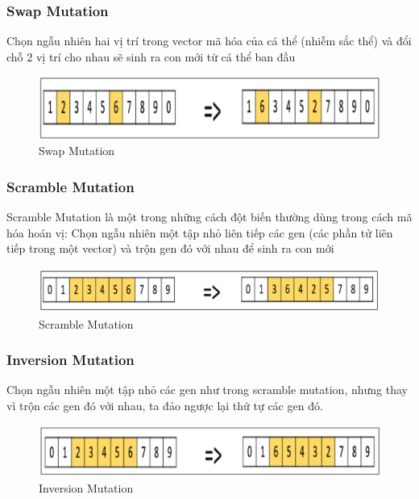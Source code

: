 \documentclass[a4paper,12pt]{report}
\begin{document}
\subsubsection{Swap Mutation}
Chọn ngẫu nhiên hai vị trí trong vector mã hóa của cá thể (nhiễm sắc thể) và đổi chỗ 2 vị trí cho nhau sẽ sinh ra con mới từ cá thể ban đầu
\begin{figure}[H]
\centering 
\includegraphics[scale=0.4]{swap_mutation.png}
\caption{Swap Mutation}
\end{figure}

\subsubsection{Scramble Mutation}
Scramble Mutation là một trong những cách đột biến thường dùng trong cách mã hóa hoán vị: Chọn ngẫu nhiên một tập nhỏ liên tiếp các gen (các phần tử liên tiếp trong một vector) và trộn gen đó với nhau để sinh ra con mới
\begin{figure}[H]
\centering 
\includegraphics[scale=0.4]{scramble_mutation.png}
\caption{Scramble Mutation}
\end{figure}

\subsubsection{Inversion Mutation}
Chọn ngẫu nhiên một tập nhỏ các gen như trong scramble mutation, nhưng thay vì trộn các gen đó với nhau, ta đảo ngược lại thứ tự các gen đó.
\begin{figure}[H]
\centering 
\includegraphics[scale=0.4]{inversion_mutation.png}
\caption{Inversion Mutation}
\end{figure}
\end{document}
